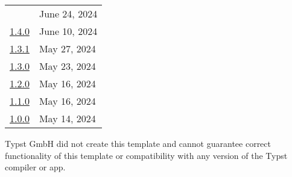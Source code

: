 \begin{longtable}[]{@{}ll@{}}
& June 24, 2024 \\
\href{https://typst.app/universe/package/supercharged-dhbw/1.4.0/}{1.4.0}
& June 10, 2024 \\
\href{https://typst.app/universe/package/supercharged-dhbw/1.3.1/}{1.3.1}
& May 27, 2024 \\
\href{https://typst.app/universe/package/supercharged-dhbw/1.3.0/}{1.3.0}
& May 23, 2024 \\
\href{https://typst.app/universe/package/supercharged-dhbw/1.2.0/}{1.2.0}
& May 16, 2024 \\
\href{https://typst.app/universe/package/supercharged-dhbw/1.1.0/}{1.1.0}
& May 16, 2024 \\
\href{https://typst.app/universe/package/supercharged-dhbw/1.0.0/}{1.0.0}
& May 14, 2024 \\
\end{longtable}

Typst GmbH did not create this template and cannot guarantee correct
functionality of this template or compatibility with any version of the
Typst compiler or app.
